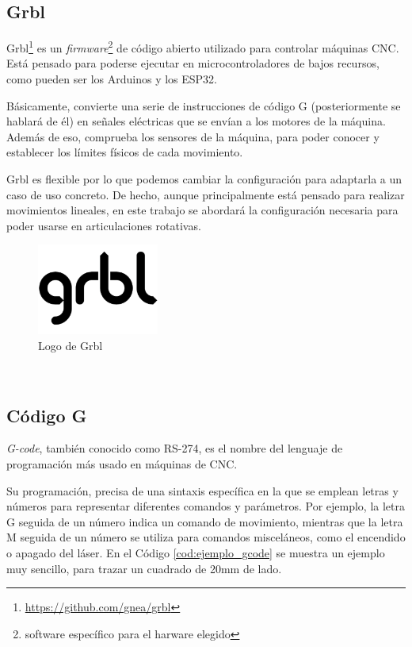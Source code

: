 \subsection{Grbl}
\label{subsec:grbl}
\noindent Grbl\footnote{\url{https://github.com/gnea/grbl}} es un \textit{firmware}\footnote{software específico para el harware elegido} de código abierto utilizado para controlar máquinas \acs{CNC}. 
Está pensado para poderse ejecutar en microcontroladores de bajos recursos, como pueden ser los Arduinos y los ESP32.

Básicamente, convierte una serie de instrucciones de código G (posteriormente se hablará de él) en señales eléctricas que se envían a 
los motores de la máquina. Además de eso, comprueba los sensores de la máquina, para poder conocer y establecer los límites físicos de cada movimiento. 

Grbl es flexible por lo que podemos cambiar la configuración para adaptarla a un caso de uso concreto. De hecho, aunque principalmente está pensado para realizar 
movimientos lineales, en este trabajo se abordará la configuración necesaria para poder usarse en articulaciones rotativas.
\begin{figure} [h!]
  \begin{center}
    \includegraphics[width=4cm]{figs/grbl.png}
  \end{center}
  \caption{Logo de Grbl}
  \label{fig:grbllogo}
\end{figure}\ 
\subsection{Código G}
\label{sec:gcode}
\noindent \textit{G-code}, también conocido como RS-274, es el nombre del lenguaje de programación más usado en máquinas de \ac{CNC}. 

Su programación, precisa de una sintaxis específica en la que se emplean letras y números para representar 
diferentes comandos y parámetros. Por ejemplo, la letra G seguida de un número indica un comando de movimiento, mientras 
que la letra M seguida de un número se utiliza para comandos misceláneos, como el encendido o apagado del láser.
En el Código \ref{cod:ejemplo_gcode} se muestra un ejemplo muy sencillo, para trazar un cuadrado de 20mm de lado.

